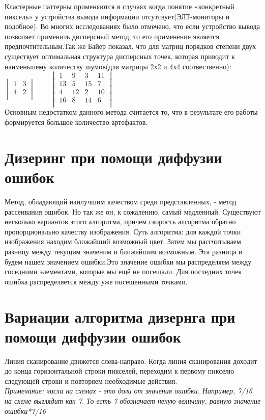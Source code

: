 Кластерные паттерны применяются в случаях когда понятие «конкретный пиксель» у устройства вывода информации отсутсвует(ЭЛТ-мониторы и подобное). Во многих исследованиях \cite{Bayer}\cite{Dh} было отмечено, что если устройство вывода позволяет применить дисперсный метод, то его применение является предпочтительным.Так же Байер \cite{Bayer} показал, что для матриц порядков степени двух существует оптимальная структура дисперсных точек, которая приводит к наименьшему количеству шумов(для матрицы 2х2 и 4х4 соотвественно):\\
$\begin{vmatrix}
1 & 3 \\          
4 & 2   \\
\end{vmatrix}$ ~~~
$\begin{vmatrix}
1& 9& 3& 11\\
13& 5& 15& 7\\
4& 12& 2& 10\\
16& 8&14&6\\
\end{vmatrix}$\\
Основным недостатком данного метода считается то, что в результате его работы формируется большое количество артефактов\cite{Ulich}.
\section{Дизеринг при помощи диффузии ошибок}
Метод, обладающий наилучшим качеством среди представленных, - метод рассеивания ошибок. Но так же он, к сожалению, самый медленный.\cite{Dh} Существуют несколько вариантов этого алгоритма, причем скорость алгоритма обратно пропорционально качеству изображения.\cite{Dh}
Суть алгоритма: для каждой точки изображения находим ближайший возможный цвет. Затем мы рассчитываем разницу между текущим значеним и ближайшим возможным. Эта разница и будем нашем значением ошибки.Это значение ошибки мы распределяем между соседними элементами, которые мы ещё не посещали. Для последних точек ошибка распределяется между уже посещенными точками.
\section{Вариации алгоритма дизернга при помощи диффузии ошибок}
Линия сканирование движется слева-направо. Когда линия сканирования доходит до конца горизонтальной строки пикселей, переходим к первому пикселю следующей строки и повторяем необходимые действия.\\
\textit{Примечание: числа на схемах - это доли от значения  ошибки. Например, 7/16 на схеме выглядит как 7. То есть 7 обозначает некую величину, равную значение ошибки*7/16 }
